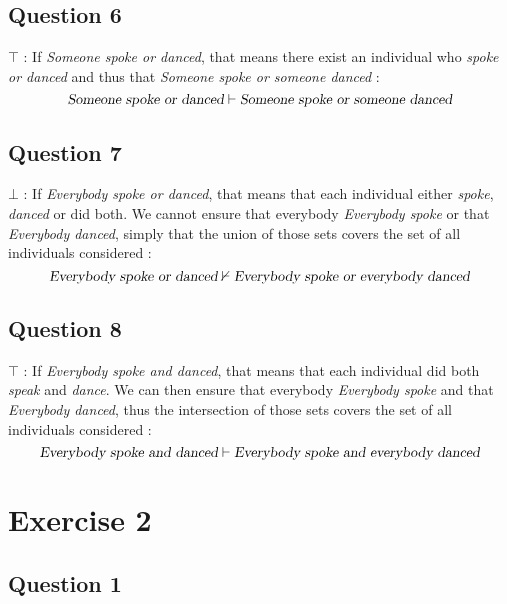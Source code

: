 \documentclass{cours}
\begin{document}
        \subsection{Question 6}
        $\top$ : If \textsl{Someone spoke or danced}, that means there exist an individual who \textsl{spoke or danced} and thus that \textsl{Someone spoke or someone danced} :
        \[
            \textsl{Someone spoke or danced} \vdash \textsl{Someone spoke or someone danced}
        \]  

        \subsection{Question 7}
        $\bot$ : If \textsl{Everybody spoke or danced}, that means that each individual either \textsl{spoke}, \textsl{danced} or did both. We cannot ensure that everybody \textsl{Everybody spoke} or that \textsl{Everybody danced}, simply that the union of those sets covers the set of all individuals considered : 
        \[
            \textsl{Everybody spoke or danced}  \nvdash \textsl{Everybody spoke or everybody danced}
        \]

        \subsection{Question 8}
        $\top$ : If \textsl{Everybody spoke and danced}, that means that each individual did both \textsl{speak} and \textsl{dance}. We can then ensure that everybody \textsl{Everybody spoke} and that \textsl{Everybody danced}, thus the intersection of those sets covers the set of all individuals considered : 
        \[
            \textsl{Everybody spoke and danced}  \vdash \textsl{Everybody spoke and everybody danced}
        \]

    \section{Exercise 2}
        \subsection{Question 1}
\end{document}
